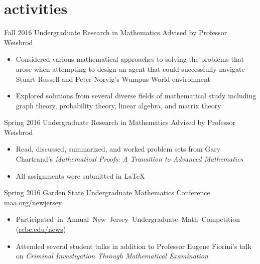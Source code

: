 \documentclass[]{friggeri-cv}
\begin{document}
\section{activities}
    \begin{entrylist}
        \entry
        {Fall 2016}
        {Undergraduate Research in Mathematics}
        {Advised by Professor Weisbrod}
        {%
            \vspace{-0.3cm}%
            \begin{itemize}[leftmargin=5pt]%
                \item Considered various mathematical approaches to solving the problems that arose when attempting to design an agent that could successfully navigate Stuart Russell and Peter Norvig's Wumpus World environment%
                \item Explored solutions from several diverse fields of mathematical study including graph theory, probability theory, linear algebra, and matrix theory%
            \end{itemize}%
        }
    \end{entrylist}
    \begin{entrylist}
        \entry
        {Spring 2016}
        {Undergraduate Research in Mathematics}
        {Advised by Professor Weisbrod}
        {%
            \vspace{-0.3cm}
            \begin{itemize}[leftmargin=5pt]%
                \item Read, discussed, summarized, and worked problem sets from Gary Chartrand's \emph{Mathematical Proofs: A Transition to Advanced Mathematics}%
                \item All assignments were submitted in \LaTeX%
            \end{itemize}%
        }
    \end{entrylist}
    \begin{entrylist}
        \entry
        {Spring 2016}
        {Garden State Undergraduate Mathematics Conference}
        {\href{http://sections.maa.org/newjersey/GSUMC/schedule.htm}{maa.org/newjersey}}
        {%
        \vspace{-0.3cm}%
        \begin{itemize}[leftmargin=5pt]%
            \item \mbox{Participated in Annual New Jersey Undergraduate Math Competition} (\href{http://www.rcbc.edu/news/rowan-college-burlington-county-top-two-year-school-statewide-mathematics-competition}{rcbc.edu/news})%
            \item Attended several student talks in addition to Professor Eugene Fiorini's talk on \emph{Criminal Investigation Through Mathematical Examination}
        \end{itemize}%
        }
    \end{entrylist}
\end{document}
